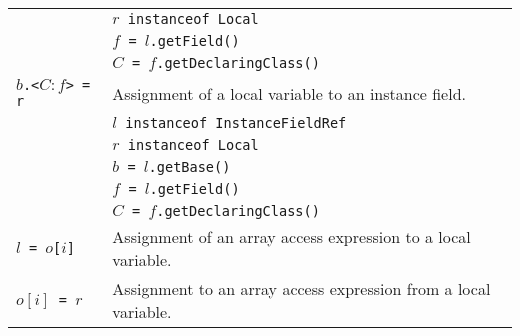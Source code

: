 \documentclass{article}
\begin{document}
\begin{scriptsize}
\begin{tabular}{ll}
                & \texttt{$r$ instanceof Local}\\
                & \texttt{$f$ = $l$.getField()}\\
                & \texttt{$C$ = $f$.getDeclaringClass()}\\
\hline
\texttt{$b$.<$C:f$> = r}       & Assignment of a local variable to an instance field.\\
                & \texttt{$l$ instanceof InstanceFieldRef} \\
                & \texttt{$r$ instanceof Local}\\
                & \texttt{$b$ = $l$.getBase()}\\
                & \texttt{$f$ = $l$.getField()}\\
                & \texttt{$C$ = $f$.getDeclaringClass()}\\
\hline
\texttt{$l$ = $o$[$i$]}              & Assignment of an array access expression to a local variable.\\
\hline
\texttt{$o[i]$ = $r$}              & Assignment to an array access expression from a local variable.\\
\hline
\end{tabular}
\end{scriptsize}
\end{document}
